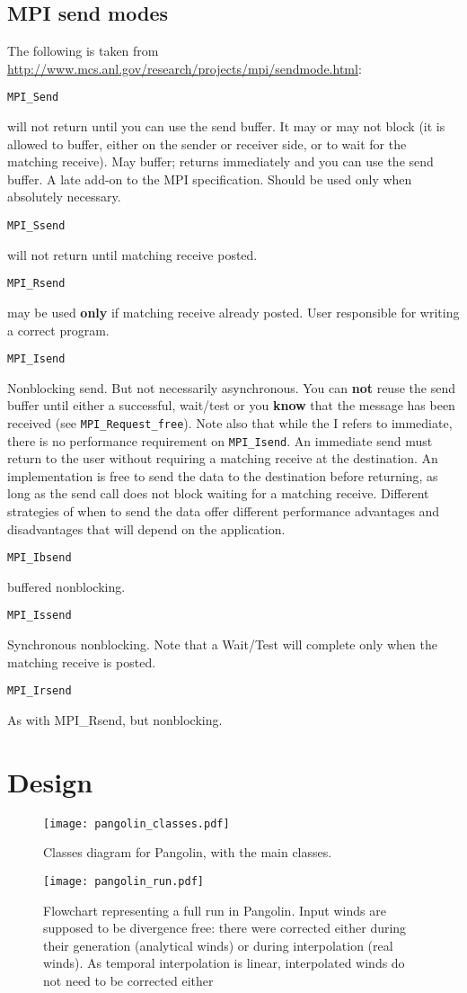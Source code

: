 \section{MPI send modes}
\label{app:mpi_send}
The following is taken from
\url{http://www.mcs.anl.gov/research/projects/mpi/sendmode.html}:

\def\entry#1#2{\leftskip=0pt \texttt{#1}\par\noindent
\leftskip=1.5cm #2\par\indent}

\entry{MPI\_Send}{will not return until you can use the send buffer. It may or may
not block (it is allowed to buffer, either on the sender or receiver side,
or to wait for the matching receive). 
May buffer; returns immediately and you can use the send buffer. A late
add-on to the MPI specification. Should be used only when absolutely
necessary.}
\entry{MPI\_Ssend}{will not return until matching receive posted.}
\entry{MPI\_Rsend}{may be used \textbf{only} if matching receive already posted. User
responsible for writing a correct program.}
\entry{MPI\_Isend}{
    Nonblocking send. But not necessarily asynchronous. You can
    \textbf{not} reuse the send buffer until either a successful,
    wait/test or you \textbf{know} that the message has been received
    (see \texttt{MPI\_Request\_free}). Note also that while the I refers to
    immediate, there is no performance requirement on \texttt{MPI\_Isend}.
    An immediate send must return to the user without requiring
    a matching receive at the destination. An implementation is
    free to send the data to the destination before returning,
    as long as the send call does not block waiting for a
    matching receive. Different strategies of when to send the
    data offer different performance advantages and
    disadvantages that will depend on the application. 
  }
\entry{MPI\_Ibsend}{buffered nonblocking.}
\entry{MPI\_Issend}{
    Synchronous nonblocking. Note that a Wait/Test will
    complete only when the matching receive is posted. 
}
\entry{MPI\_Irsend}{ As with MPI\_Rsend, but nonblocking.}

\chapter{Design}
\begin{figure}[h]
  \centering
  \texttt{[image: pangolin\_classes.pdf]}
  \caption{Classes diagram for Pangolin, with the main classes.}
\end{figure}

\begin{figure}[h]
  \centering
  \texttt{[image: pangolin\_run.pdf]}
  \caption{Flowchart representing a full run in Pangolin. Input winds are
    supposed to be divergence free: there were corrected either during their
    generation (analytical winds) or during interpolation (real winds). As
    temporal interpolation is linear, interpolated winds do not need to be corrected
    either}
  \label{fig:pango_run}
\end{figure}

